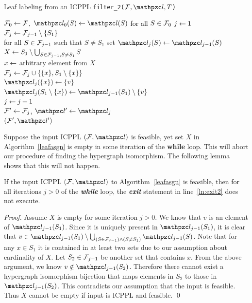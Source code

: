 \documentclass[MS]             %
              {iitmdiss_as}    %
\begin{document}
\begin{algorithm}[h]
  \caption{Leaf labeling from an ICPPL {\tt filter\_2($\cF, \cl, T$)}}
  \label{leafasgn}
  \begin{algorithmic}[\lndisplay]
    \STATE ${\cal F}_0 \leftarrow {\cal F}$, $\cl_0(S) \assign \cl(S)$ for all $S \in {\cal F}_0$
    \STATE $j \leftarrow 1$\\
    \label{uniqueleaf}
    \STATE ${\cal F}_j \leftarrow {\cal F}_{j-1} \setminus \{S_1\}$\\
    \STATE for all $S \in {\cal F}_{j-1}$ such that $S \ne S_1$ set
    $\cl_j(S) \assign
    \cl_{j-1}(S)$\\
    \STATE $X \leftarrow S_1 \setminus \bigcup_{S \in {\cal F}_{j-1}, S \ne S_1}S$\\
     \label{xempty}  \label{ln:exit2} \ENDIF
    \STATE $x \leftarrow $ arbitrary element from $X$\\
    \STATE ${\cal F}_j \leftarrow {\cal F}_j \cup \{\{x\}, S_1 \setminus \{x\}\} $\\
    \STATE $\cl_j(\{x\}) \assign \{v\}$\\
    \STATE $\cl_j(S_1 \setminus \{x\}) \assign \cl_{j-1}(S_1) \setminus \{v\}$\\
    \STATE $j \leftarrow j+1$\\
    \ENDWHILE
    \STATE ${\cal F}' \leftarrow {\cal F}_j$, $\cl' \assign \cl_j$\\
    \RETURN $(\cF', \cl')$
  \end{algorithmic}
\end{algorithm}


Suppose the input ICPPL $(\cF, \cl)$ is feasible, yet set $X$ in
Algorithm~\ref{leafasgn} is empty in some iteration of the {\bf while}
loop. This will abort our procedure of finding the hypergraph
isomorphism. The following lemma shows that this will not happen.

\begin{lemma}
  \label{lem:xnotempty}
  If the input ICPPL $(\cF, \cl)$ to Algorithm~\ref{leafasgn} is
  feasible, then for all iterations $j > 0$ of the {\em \bf while}
  loop, the {\em \bf exit} statement in line~\ref{ln:exit2} does not
  execute.
\end{lemma}
\begin{proof}
  Assume $X$ is empty for some iteration $j > 0$. We know that $v$ is
  an element of $\cl_{j-1}(S_1)$. Since it is uniquely present in
  $\cl_{j-1}(S_1)$, it is clear that $v \in \cl_{j-1}(S_1) \setminus
  \bigcup_{(S \in \cF_{j-1}) \wedge (S \ne S_1)}\cl_{j-1}(S)$.  Note
  that for any $x \in S_1$ it is contained in at least two sets due to
  our assumption about cardinality of $X$. Let $S_2 \in {\cal F}_{j-1}$ be
  another set that contains $x$. From the above argument, we know $v
  \notin \cl_{j-1}(S_2)$. Therefore there cannot exist a hypergraph
  isomorphism bijection that maps elements in $S_2$ to those in
  $\cl_{j-1}(S_2)$. This contradicts our assumption that the input is
  feasible. Thus $X$ cannot be empty if input is ICPPL and feasible.
  \qed
\end{proof}
\end{document}
